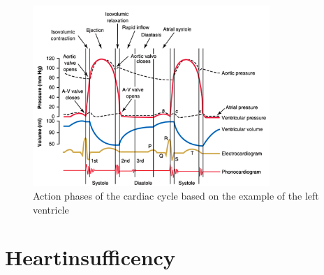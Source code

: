 \begin{figure}[h]
  \centering
  \includegraphics[width=0.8\textwidth]{images/cardiac_cycle.jpg}
  \caption{Action phases of the cardiac cycle based on the example of the left ventricle \cite{GH20}}
  \label{fig:cardiac_cycle}
\end{figure}
\section{Heartinsufficency}
